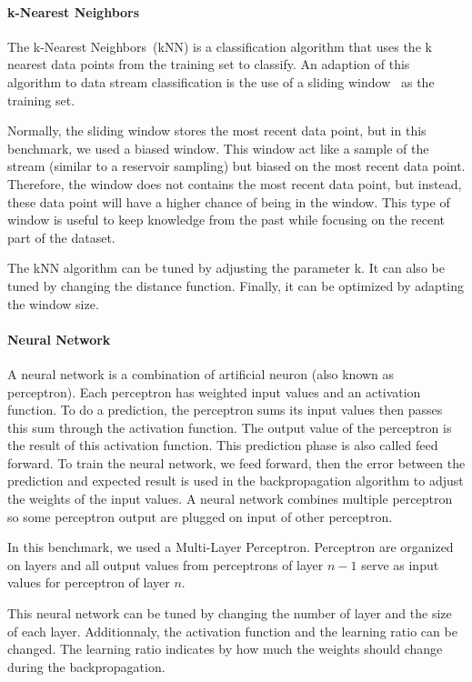\paragraph{k-Nearest Neighbors~\cite{biased_reservoir_sampling}}
The k-Nearest Neighbors~(kNN) is a classification algorithm that uses the k
nearest data points from the training set to classify.  An adaption of this
algorithm to data stream classification is the use of a sliding
window~\cite{Mining_Massive_Datasets} as the training set.

Normally, the sliding window stores the most recent data point, but in this
benchmark, we used a biased window. This window act like a sample of the stream
(similar to a reservoir sampling) but biased on the most recent data point.
Therefore, the window does not contains the most recent data point, but
instead, these data point will have a higher chance of being in the window.
This type of window is useful to keep knowledge from the past while focusing on
the recent part of the dataset.

The kNN algorithm can be tuned by adjusting the parameter k. It can also be
tuned by changing the distance function. Finally, it can be optimized by
adapting the window size.

\paragraph{Neural Network}
A neural network is a combination of artificial neuron (also known as
perceptron). Each perceptron has weighted input values and an activation
function. To do a prediction, the perceptron sums its input values then passes
this sum through the activation function. The output value of the perceptron is
the result of this activation function. This prediction phase is also called
feed forward.  To train the neural network, we feed forward, then the error
between the prediction and expected result is used in the backpropagation
algorithm to adjust the weights of the input values.  A neural network combines
multiple perceptron so some perceptron output are plugged on input of other
perceptron.

In this benchmark, we used a Multi-Layer Perceptron. Perceptron are organized
on layers and all output values from perceptrons of layer $n-1$ serve as input
values for perceptron of layer $n$. 

This neural network can be tuned by changing the number of layer and the size
of each layer. Additionnaly, the activation function and the learning ratio can
be changed. The learning ratio indicates by how much the weights should change
during the backpropagation.

